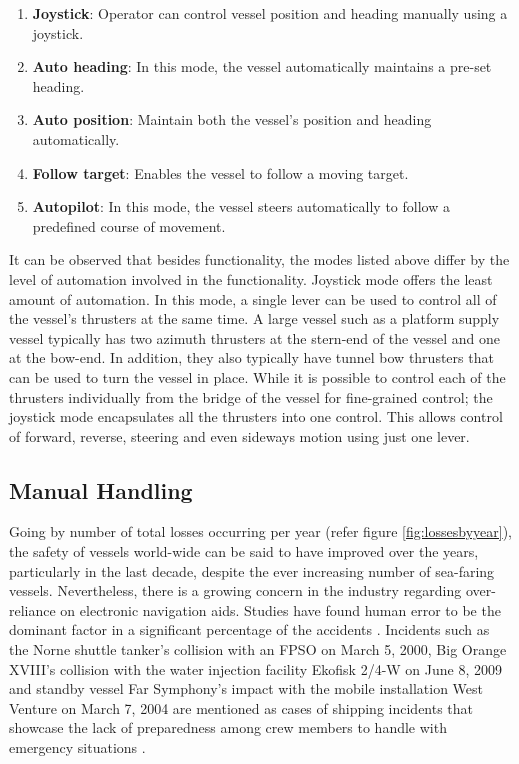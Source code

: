 \begin{enumerate}

\item \textbf{Joystick}: Operator can control vessel position and heading manually using a joystick. 
\item \textbf{Auto heading}: In this mode, the vessel automatically maintains a pre-set heading. 
\item \textbf{Auto position}: Maintain both the vessel's position and heading automatically. 
\item \textbf{Follow target}: Enables the vessel to follow a moving target. 
\item \textbf{Autopilot}: In this mode, the vessel steers automatically to follow a predefined course of movement. 

\end{enumerate}

It can be observed that besides functionality, the modes listed above differ by the level of automation involved in the functionality. Joystick mode offers the least amount of automation. In this mode, a single lever can be used to control all of the vessel's thrusters at the same time. A large vessel such as a platform supply vessel typically has two azimuth thrusters at the stern-end of the vessel and one at the bow-end. In addition, they also typically have tunnel bow thrusters that can be used to turn the vessel in place. While it is possible to control each of the thrusters individually from the bridge of the vessel for fine-grained control; the joystick mode encapsulates all the thrusters into one control. This allows control of forward, reverse, steering and even sideways motion using just one lever. 


\subsection{Manual Handling}
Going by number of total losses occurring per year (refer figure \ref{fig:lossesbyyear}), the safety of vessels world-wide can be said to have improved over the years, particularly in the last decade, despite the ever increasing number of sea-faring vessels. Nevertheless, there is a growing concern in the industry regarding over-reliance on electronic navigation aids. Studies have found human error to be the dominant factor in a significant percentage of the accidents \parencite{baker2005accident, hauff2014analysis}. Incidents such as the Norne shuttle tanker's collision with an FPSO on March 5, 2000, Big Orange XVIII's collision with the water injection facility Ekofisk 2/4-W on June 8, 2009 and standby vessel Far Symphony's impact with the mobile installation West Venture on March 7, 2004 are mentioned as cases of shipping incidents that showcase the lack of preparedness among crew members to handle with emergency situations \parencite{vinnem2013offshore}.

